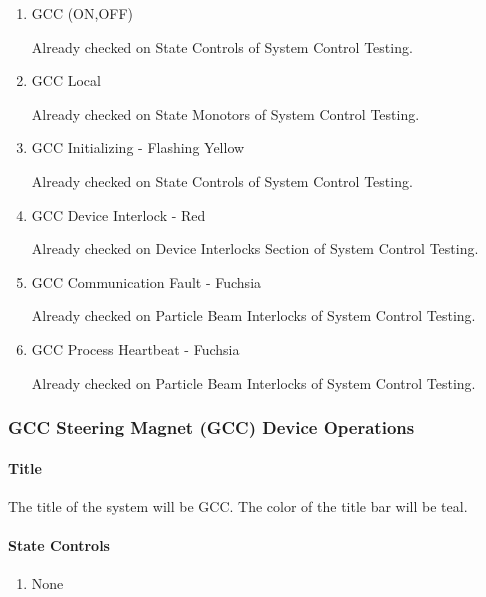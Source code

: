 \documentclass[11pt]{book}		%
\begin{document}
\begin{enumerate}
 \item GCC (ON,OFF)

\color{red}
Already checked on State Controls of System Control Testing.
\color{black}

 \item GCC Local

\color{red}
Already checked on State Monotors of System Control Testing.
\color{black}

 \item GCC Initializing - Flashing Yellow

\color{red}
Already checked on State Controls of System Control Testing.
\color{black}

 \item GCC Device Interlock - Red

\color{red}
Already checked on Device Interlocks Section of System Control Testing.
\color{black}

 \item GCC Communication Fault - Fuchsia

\color{red}
Already checked on Particle Beam Interlocks of System Control Testing.
\color{black}

 \item GCC Process Heartbeat - Fuchsia

\color{red}
Already checked on Particle Beam Interlocks of System Control Testing.
\color{black}

\end{enumerate}

\subsubsection{GCC Steering Magnet (GCC) Device Operations}

\paragraph{Title} \label{sect:cyc-op-interface-ops-terminal-device-ops-gcc-title}

The title of the system will be GCC.  The color of the title bar will be teal.

\paragraph{State Controls}

\begin{enumerate}
\item None
\end{enumerate}
\end{document}
